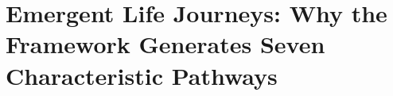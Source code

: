%
%
%
%
%
%
%

\chapter{Emergent Life Journeys: Why the Framework Generates Seven Characteristic Pathways}
\label{ch:emergent-life-journeys}
\label{ch:24}


